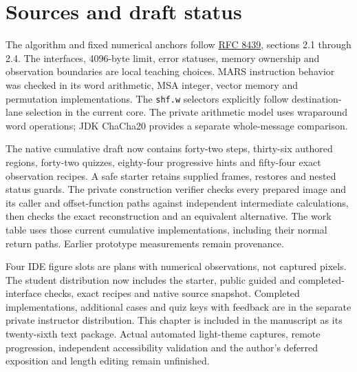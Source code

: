 \section{Sources and draft status}
The algorithm and fixed numerical anchors follow
\href{https://www.rfc-editor.org/rfc/rfc8439.html}{RFC 8439}, sections 2.1 through 2.4.
The interfaces, 4096-byte limit, error statuses, memory ownership and observation
boundaries are local teaching choices. MARS instruction behavior was checked in its
word arithmetic, MSA integer, vector memory and permutation implementations. The
\texttt{shf.w} selectors explicitly follow destination-lane selection in the current
core. The private arithmetic model uses wraparound word operations; JDK ChaCha20
provides a separate whole-message comparison.

The native cumulative draft now contains forty-two steps, thirty-six authored
regions, forty-two quizzes, eighty-four progressive hints and fifty-four exact
observation recipes. A safe starter retains supplied frames, restores and nested
status guards. The private construction verifier checks every prepared image and
its caller and offset-function paths against independent intermediate calculations,
then checks the exact reconstruction and an equivalent alternative. The work table
uses those current cumulative implementations, including their normal return paths.
Earlier prototype measurements remain provenance.

Four IDE figure slots are plans with numerical observations, not captured pixels.
The student distribution now includes the starter, public guided and completed-interface
checks, exact recipes and native source snapshot. Completed implementations, additional
cases and quiz keys with feedback are in the separate private instructor distribution.
This chapter is included in the manuscript as its twenty-sixth text package.
Actual automated light-theme captures, remote progression, independent accessibility
validation and the author's deferred exposition and length editing remain unfinished.
